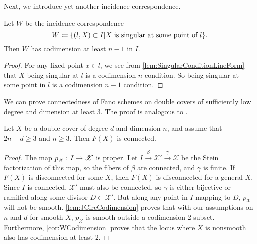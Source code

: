 Next, we introduce yet another incidence correspondence.
 \begin{lemma}
 	\label{cor:WCodimension}
 Let $W$ be the incidence correspondence
 \[ W \coloneqq \lbrace(l,X) \subset I \vert X \text{ is singular at some point of } l\rbrace. \]
 Then $W$ has codimension at least $n-1$ in $I$.
 \end{lemma}
 \begin{proof}
   For any fixed point $x \in l$, we see from \cref{lem:SingularConditionLineForm} that $X$ being singular at $l$ is a codimension $n$ condition. So being singular at some point in $l$ is a codimension $n-1$ condition. 
 \end{proof}

We can prove connectedness of Fano schemes on double covers of sufficiently low degree and dimension at least 3. The proof is analogous to \cite[Theorem V.4.3.3]{KollarRationalCurves}.
 \begin{proposition}
   \label{prop:FConnected}
 	Let $X$ be a double cover of degree $d$ and dimension $n$, and assume that $2n-d \geq 3$ and $n \geq 3$. Then $F(X)$ is connected.
 \end{proposition}
 \begin{proof}
 	The map $p_{\mathscr{X}} \colon I \to \mathscr{X}$ is proper. Let $I \xrightarrow{\beta} \mathscr{X}' \xrightarrow{\gamma} \mathscr{X}$ be the Stein factorization of this map, so the fibers of $\beta$ are connected, and $\gamma$ is finite. If $F(X)$ is disconnected for some $X$, then $F(X)$ is disconnected for a general $X$. Since $I$ is connected, $\mathscr{X}'$ must also be connected, so $\gamma$ is either bijective or ramified along some divisor $D \subset \mathscr{X}'$. But along any point in $I$ mapping to $D$, $p_{\mathscr{X}}$ will not be smooth. \cref{lem:JCircCodimension} proves that with our assumptions on $n$ and $d$ for smooth $X$, $p_{\mathscr{X}}$ is smooth outside a codimension 2 subset. Furthermore, \cref{cor:WCodimension} proves that the locus where $X$ is nonsmooth also has codimension at least 2. 
\end{proof}

\printbibliography[heading = subbibliography]
\stopcontents[chapters]
